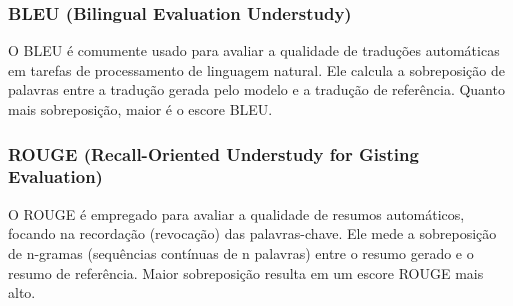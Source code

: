 \subsubsection{BLEU (Bilingual Evaluation Understudy)}
O BLEU é comumente usado para avaliar a qualidade de traduções automáticas em tarefas de processamento de linguagem natural. Ele calcula a sobreposição de palavras entre a tradução gerada pelo modelo e a tradução de referência. Quanto mais sobreposição, maior é o escore BLEU.

\subsubsection{ROUGE (Recall-Oriented Understudy for Gisting Evaluation)}
O ROUGE é empregado para avaliar a qualidade de resumos automáticos, focando na recordação (revocação) das palavras-chave. Ele mede a sobreposição de n-gramas (sequências contínuas de n palavras) entre o resumo gerado e o resumo de referência. Maior sobreposição resulta em um escore ROUGE mais alto.



%

\newpage